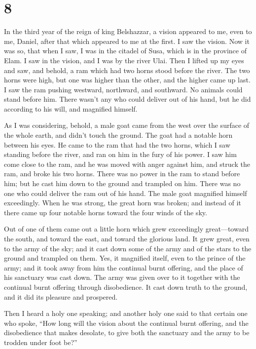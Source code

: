 \hypertarget{section-7}{%
\section{8}\label{section-7}}

 In the third year of the reign of king Belshazzar, a vision
appeared to me, even to me, Daniel, after that which appeared to me at
the first.  I saw the vision. Now it was so, that when I
saw, I was in the citadel of Susa, which is in the province of Elam. I
saw in the vision, and I was by the river Ulai.  Then I
lifted up my eyes and saw, and behold, a ram which had two horns stood
before the river. The two horns were high, but one was higher than the
other, and the higher came up last.  I saw the ram pushing
westward, northward, and southward. No animals could stand before him.
There wasn't any who could deliver out of his hand, but he did according
to his will, and magnified himself.

 As I was considering, behold, a male goat came from the
west over the surface of the whole earth, and didn't touch the ground.
The goat had a notable horn between his eyes.  He came to
the ram that had the two horns, which I saw standing before the river,
and ran on him in the fury of his power.  I saw him come
close to the ram, and he was moved with anger against him, and struck
the ram, and broke his two horns. There was no power in the ram to stand
before him; but he cast him down to the ground and trampled on him.
There was no one who could deliver the ram out of his hand. 
The male goat magnified himself exceedingly. When he was strong, the
great horn was broken; and instead of it there came up four notable
horns toward the four winds of the sky.

 Out of one of them came out a little horn which grew
exceedingly great---toward the south, and toward the east, and toward
the glorious land.  It grew great, even to the army of the
sky; and it cast down some of the army and of the stars to the ground
and trampled on them.  Yes, it magnified itself, even to
the prince of the army; and it took away from him the continual burnt
offering, and the place of his sanctuary was cast down. 
The army was given over to it together with the continual burnt offering
through disobedience. It cast down truth to the ground, and it did its
pleasure and prospered.

 Then I heard a holy one speaking; and another holy one
said to that certain one who spoke, ``How long will the vision about the
continual burnt offering, and the disobedience that makes desolate, to
give both the sanctuary and the army to be trodden under foot be?''


